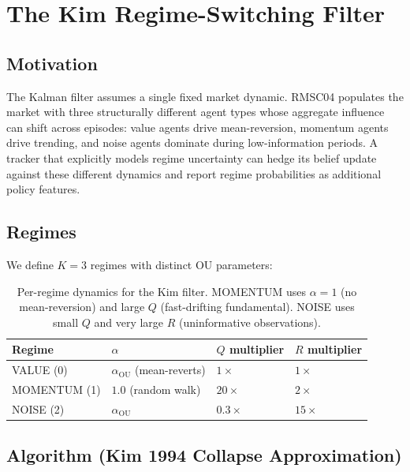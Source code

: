 \documentclass[11pt]{article}
\begin{document}
\section{The Kim Regime-Switching Filter}

\subsection{Motivation}

The Kalman filter assumes a single fixed market dynamic.
RMSC04 populates the market with three structurally different agent types
whose aggregate influence can shift across episodes:
value agents drive mean-reversion, momentum agents drive trending, and
noise agents dominate during low-information periods.
A tracker that explicitly models regime uncertainty can hedge its belief
update against these different dynamics and report regime probabilities
as additional policy features.

\subsection{Regimes}

We define $K=3$ regimes with distinct OU parameters:

\begin{table}[H]
\centering
\begin{tabular}{llll}
\toprule
\textbf{Regime} & \textbf{$\alpha$} & \textbf{$Q$ multiplier} & \textbf{$R$ multiplier} \\
\midrule
VALUE (0)    & $\alpha_{\text{OU}}$ (mean-reverts) & $1\times$   & $1\times$ \\
MOMENTUM (1) & $1.0$ (random walk)                 & $20\times$  & $2\times$ \\
NOISE (2)    & $\alpha_{\text{OU}}$                & $0.3\times$ & $15\times$ \\
\bottomrule
\end{tabular}
\caption{Per-regime dynamics for the Kim filter.
MOMENTUM uses $\alpha=1$ (no mean-reversion) and large $Q$ (fast-drifting
fundamental). NOISE uses small $Q$ and very large $R$ (uninformative observations).}
\end{table}

\subsection{Algorithm (Kim 1994 Collapse Approximation)}
\end{document}
